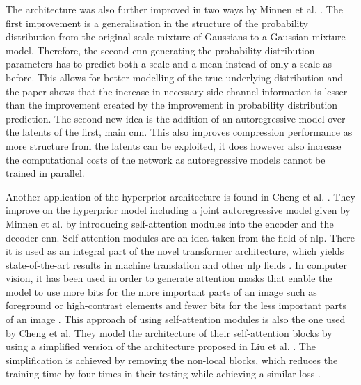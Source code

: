 The architecture was also further improved in two ways by Minnen et al. \citep{minnen_joint_2018}. The first improvement is a generalisation in the structure of the probability distribution from the original scale mixture of Gaussians \citep{wainwright_scale_1999} to a Gaussian mixture model. Therefore, the second \ac{cnn} generating the probability distribution parameters has to predict both a scale and a mean instead of only a scale as before. This allows for better modelling of the true underlying distribution and the paper shows that the increase in necessary side-channel information is lesser than the improvement created by the improvement in probability distribution prediction.
The second new idea is the addition of an autoregressive model over the latents of the first, main \ac{cnn}. This also improves compression performance as more structure from the latents can be exploited, it does however also increase the computational costs of the network as autoregressive models cannot be trained in parallel. 

Another application of the hyperprior architecture is found in Cheng et al. \citep{cheng_learned_2020}. They improve on the hyperprior model including a joint autoregressive model given by Minnen et al. \citep{minnen_joint_2018} by introducing self-attention modules into the encoder and the decoder \ac{cnn}. Self-attention modules are an idea taken from the field of \ac{nlp}. There it is used as an integral part of the novel transformer architecture, which yields state-of-the-art results in machine translation and other \ac{nlp} fields \citep{vaswani_attention_2017}. In computer vision, it has been used in order to generate attention masks that enable the model to use more bits for the more important parts of an image such as foreground or high-contrast elements and fewer bits for the less important parts of an image \citep{liu_non-local_2019,li_learning_2018,mentzer_conditional_2018}. This approach of using self-attention modules is also the one used by Cheng et al. They model the architecture of their self-attention blocks by using a simplified version of the architecture proposed in Liu et al. \citep{liu_non-local_2019}. The simplification is achieved by removing the non-local blocks, which reduces the training time by four times in their testing while achieving a similar loss \citep{cheng_learned_2020}.
